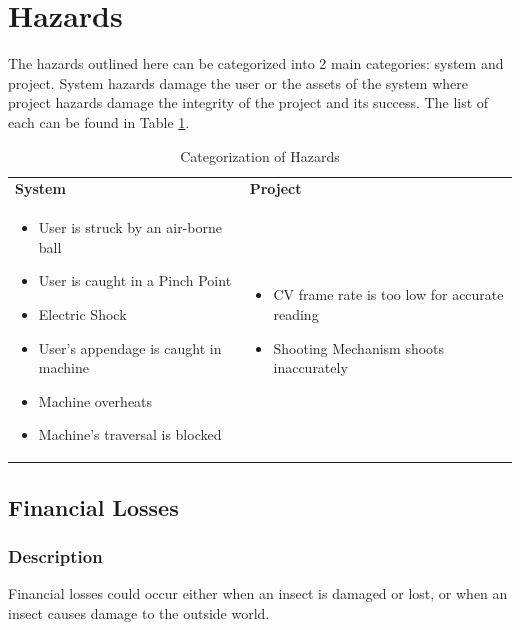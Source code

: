 \documentclass[11pt]{article}
\begin{document}
\section{Hazards}
The hazards outlined here can be categorized into 2 main categories: system and project. System hazards damage the user or the assets of the system where project hazards damage the integrity of the project and its success. The list of each can be found in Table \ref{table:hazard}. \\
\begin{table}[H]
\centering
\caption{Categorization of Hazards}
\label{table:hazard}
\begin{tabular}{ | >{\raggedright\arraybackslash}p{} | >{\raggedright\arraybackslash}p{} | }
\hline
\multicolumn{2}{|c|}{\textbf{Hazards}} \\ \hline
\textbf{System}   & \textbf{Project}   \\ \hline
\begin{itemize}
\item User is struck by an air-borne ball
\item User is caught in a Pinch Point
\item Electric Shock
\item User's appendage is caught in machine
\item Machine overheats
\item Machine's traversal is blocked
\end{itemize}
&
\begin{itemize}
\item CV frame rate is too low for accurate reading
\item Shooting Mechanism shoots inaccurately
\end{itemize}
\\ \hline
\end{tabular}
\end{table}


\subsection{Financial Losses}
\subsubsection*{Description}
Financial losses could occur either when an insect is damaged or lost, or when an insect causes
damage to the outside world. \\
\end{document}
